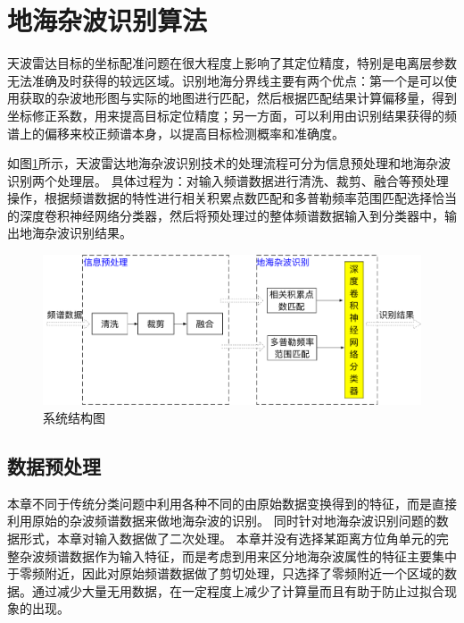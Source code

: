 \section{地海杂波识别算法}
\label{sec:othr_cnn}
天波雷达目标的坐标配准问题在很大程度上影响了其定位精度，特别是电离层参数无法准确及时获得的较远区域。识别地海分界线主要有两个优点：第一个是可以使用获取的杂波地形图与实际的地图进行匹配，然后根据匹配结果计算偏移量，得到坐标修正系数，用来提高目标定位精度；另一方面，可以利用由识别结果获得的频谱上的偏移来校正频谱本身，以提高目标检测概率和准确度。

如图\ref{fig:system}所示，天波雷达地海杂波识别技术的处理流程可分为信息预处理和地海杂波识别两个处理层。
具体过程为：对输入频谱数据进行清洗、裁剪、融合等预处理操作，根据频谱数据的特性进行相关积累点数匹配和多普勒频率范围匹配选择恰当的深度卷积神经网络分类器，然后将预处理过的整体频谱数据输入到分类器中，输出地海杂波识别结果。
\begin{figure}[hbt]
	\centering
	\includegraphics[width=\textwidth]{figures/othr/system}
	\caption{系统结构图}
	\label{fig:system}
\end{figure}

\subsection{数据预处理}

本章不同于传统分类问题中利用各种不同的由原始数据变换得到的特征，而是直接利用原始的杂波频谱数据来做地海杂波的识别。
同时针对地海杂波识别问题的数据形式，本章对输入数据做了二次处理。
本章并没有选择某距离方位角单元的完整杂波频谱数据作为输入特征，而是考虑到用来区分地海杂波属性的特征主要集中于零频附近，因此对原始频谱数据做了剪切处理，只选择了零频附近一个区域的数据。通过减少大量无用数据，在一定程度上减少了计算量而且有助于防止过拟合现象的出现。

